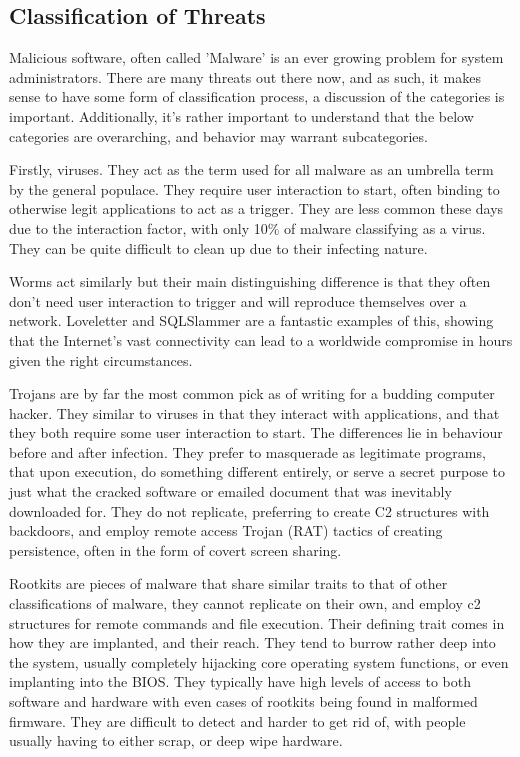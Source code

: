\subsection{Classification of Threats}
Malicious software, often called 'Malware' is an ever growing problem for system administrators. There are many threats out there now, and as such, it makes sense to have some form of classification process, a discussion of the categories is 
important. Additionally, it's rather important to understand that the below categories are overarching, and behavior may warrant subcategories. \citep{MalwareClass} 

Firstly, viruses. They act as the term used for all malware as an umbrella term by the general populace.
They require user interaction to start, often binding to otherwise legit applications to act as a trigger. They are less common these days due to the interaction factor, with only 10\% of malware classifying as a virus. They can be quite difficult to clean up due to their infecting nature. \citep{MalwareClass}

Worms act similarly but their main distinguishing difference is that they often don't need user interaction to trigger and will reproduce themselves over a network. Loveletter and SQLSlammer are a fantastic examples of this, showing that the Internet's vast connectivity
can lead to a worldwide compromise in hours given the right circumstances. \citep{MalwareClass} 

Trojans are by far the most common pick as of writing for a budding computer hacker. They similar to viruses in that they interact with applications, and that they both require some user interaction to start. The differences lie in behaviour before and after infection. 
They prefer to masquerade as legitimate programs, that upon execution, do something different entirely, or serve a secret purpose to just what the cracked software or emailed document that was inevitably downloaded for. They do not replicate, preferring to create C2 structures with backdoors,
and employ remote access Trojan (RAT) tactics of creating persistence, often in the form of covert screen sharing. \citep{virusVsTrojan}


Rootkits are pieces of malware that share similar traits to that of other classifications of malware, they cannot replicate on their own, and employ c2 structures for remote commands and file execution. 
Their defining trait comes in how they are implanted, and their reach. They tend to burrow rather deep into the system, usually completely hijacking core operating system functions, or even implanting into the BIOS.
They typically have high levels of access to both software and hardware with even cases of rootkits being found in malformed firmware. They are difficult to detect and harder to get rid of, with people usually having to either scrap, or deep
wipe hardware. \cite{MalwareClass02} 

